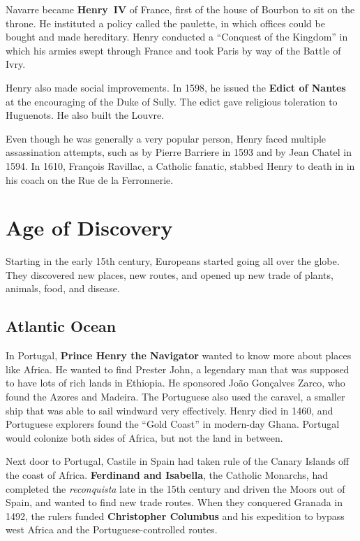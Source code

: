 Navarre became \textbf{Henry~IV} of France, first of the house of Bourbon to sit on the throne.
He instituted a policy called the paulette, in which offices could be bought and made hereditary.
Henry conducted a ``Conquest of the Kingdom'' in which his armies swept through France and took Paris
by way of the Battle of Ivry.

Henry also made social improvements.
In 1598, he issued the \textbf{Edict of Nantes} at the encouraging of the Duke of Sully.
The edict gave religious toleration to Huguenots.
He also built the Louvre.

Even though he was generally a very popular person, Henry faced multiple assassination attempts,
such as by Pierre Barriere in 1593 and by Jean Chatel in 1594.
In 1610, Fran\c{c}ois Ravillac, a Catholic fanatic,
stabbed Henry to death in in his coach on the Rue de la Ferronnerie.

\section{Age of Discovery}

Starting in the early 15th century, Europeans started going all over the globe.
They discovered new places, new routes, and opened up new trade of plants, animals, food, and disease.

\subsection*{Atlantic Ocean}

In Portugal, \textbf{Prince Henry the Navigator} wanted to know more about places like Africa.
He wanted to find Prester John, a legendary man that was supposed to have lots of rich lands in Ethiopia.
He sponsored Jo\~ao Gon\c{c}alves Zarco, who found the Azores and Madeira.
The Portuguese also used the caravel, a smaller ship that was able to sail windward very effectively.
Henry died in 1460, and Portuguese explorers found the ``Gold Coast'' in modern-day Ghana.
Portugal would colonize both sides of Africa, but not the land in between.

Next door to Portugal, Castile in Spain had taken rule of the Canary Islands off the coast of Africa.
\textbf{Ferdinand and Isabella}, the Catholic Monarchs, had completed the \textit{reconquista}
late in the 15th century and driven the Moors out of Spain, and wanted to find new trade routes.
When they conquered Granada in 1492, the rulers funded \textbf{Christopher Columbus}
and his expedition to bypass west Africa and the Portuguese-controlled routes.

